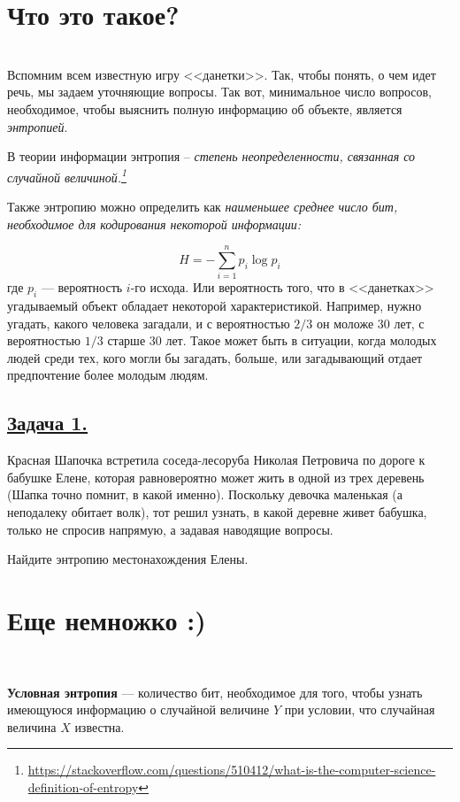 \section*{Что это такое?}~\
\\ 

Вспомним всем известную игру <<данетки>>. Так, чтобы понять, о чем идет речь, мы задаем уточняющие вопросы. Так вот, минимальное число вопросов, необходимое, чтобы выяснить полную информацию об объекте, является \textit{энтропией}.

В теории информации энтропия -- \textit{степень неопределенности, связанная со случайной величиной.\footnote{\url{https://stackoverflow.com/questions/510412/what-is-the-computer-science-definition-of-entropy}}}

Также энтропию можно определить как \textit{наименьшее среднее число бит, необходимое для кодирования некоторой информации:}

\[H=-\sum\limits_{i=1}^n p_i\log p_i \]
где $p_i$ --- вероятность $i$-го исхода. Или вероятность того, что в <<данетках>> угадываемый объект обладает некоторой характеристикой. Например, нужно угадать, какого человека загадали, и с вероятностью $2/3$ он моложе 30 лет, с вероятностью $1/3$ старше 30 лет. Такое может быть в ситуации, когда молодых людей среди тех, кого могли бы загадать, больше, или загадывающий отдает предпочтение более молодым людям. 

\subsection*{\hyperref[sec:sol_problem1]{Задача 1.}}\label{sec:problem1} 
Красная Шапочка встретила соседа-лесоруба Николая Петровича по дороге к бабушке Елене, которая равновероятно может жить в одной из трех деревень (Шапка точно помнит, в какой именно). Поскольку девочка маленькая (а неподалеку обитает волк), тот решил узнать, в какой деревне живет бабушка, только не спросив напрямую, а задавая наводящие вопросы. 

Найдите энтропию местонахождения Елены.

\section*{Еще немножко :)}~\
\\

\begin{siderules}
    \textbf{Условная энтропия} --- количество бит, необходимое для того, чтобы узнать имеющуюся информацию о случайной величине $Y$ при условии, что случайная величина $X$ известна.
\end{siderules}

